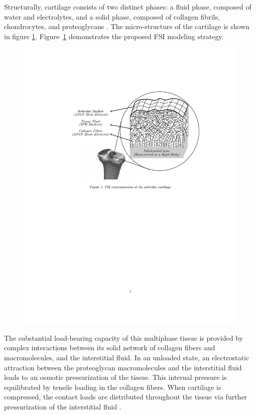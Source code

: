 Structurally, cartilage consists of two distinct phases: a fluid phase, composed of water and electrolytes, and a solid phase, composed of collagen fibrils, chondrocytes, and proteoglycans \cite{Mow1992}. The micro-structure of the cartilage is shown in figure \ref{fig:AC}.
Figure~\ref{fig:AC} demonstrates the proposed FSI modeling strategy. 
\begin{figure}[H]
	\centering
	\includegraphics[width=0.7\linewidth]{images/AC.pdf}
	\label{fig:AC}
\end{figure}
The substantial load-bearing capacity of this multiphase tissue is provided by complex interactions between its solid network of collagen fibers and macromolecules, and the interstitial fluid. In an unloaded state, an electrostatic attraction between the proteoglycan macromolecules and the interstitial fluid leads to an osmotic pressurization of the tissue. This internal pressure is equilibrated by tensile loading in the collagen fibers. When cartilage is compressed, the contact loads are distributed throughout the tissue via further pressurization of the interstitial fluid \cite{Cohen1998, Fox2009}.


